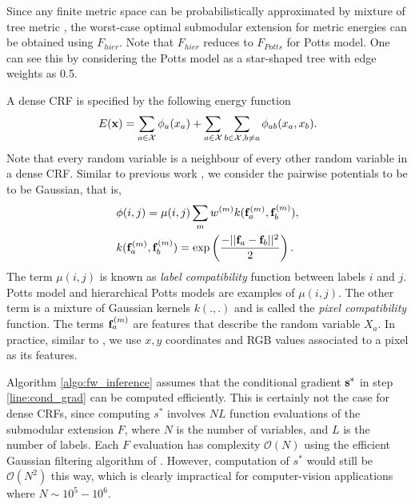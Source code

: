 Since any finite metric space can be probabilistically approximated by mixture
of tree metric \citep{bartal1996probabilistic}, the worst-case optimal
submodular extension for metric energies can be obtained using $F_{hier}$. Note
that $F_{hier}$ reduces to $F_{Potts}$ for Potts model. One can see this by
considering the Potts model as a star-shaped tree with edge weights as 0.5.

\label{sec:dense_crf}

 A dense CRF is specified by the following energy function 
\begin{equation}
    E({\bf x}) = \sum_{a \in {\mathcal X}} \phi_a(x_a) + \sum_{a \in {\mathcal X}} \sum_{b \in {\mathcal X}, b \neq a} \phi_{ab}(x_a, x_b).
\end{equation}
Note that every random variable is a neighbour of every other random variable in a dense CRF. Similar to previous work \citep{koltun2011efficient}, we consider the pairwise potentials to be to be Gaussian, that is, 
\begin{align}
    &\phi(i, j) = \mu(i, j) \sum_{m} w^{(m)} k({\bf f}_a^{(m)}, {\bf f}_b^{(m)}), \\
    &k({\bf f}_a^{(m)}, {\bf f}_b^{(m)}) = \exp\left( \frac{- ||{\bf f}_a - {\bf f}_b ||^2}{2} \right).
\end{align}
The term $\mu(i,j)$ is known as {\it label compatibility} function between
labels $i$ and $j$. Potts model and hierarchical Potts models are examples of
$\mu(i, j)$. The other term is a mixture of Gaussian kernels $k(.,.)$ and is
called the {\it pixel compatibility} function. The terms ${\bf f}_a^{(m)}$ are
features that describe the random variable $X_a$. In practice, similar to
\citep{koltun2011efficient}, we use $x, y$ coordinates and RGB values
associated to a pixel as its features.

Algorithm \ref{algo:fw_inference} assumes that the conditional gradient $\bf s^*$ in step {\ref{line:cond_grad}} can be computed efficiently. This is certainly not the case for dense CRFs, since computing $s^*$ involves $NL$ function evaluations of the submodular extension $F$, where $N$ is the number of variables, and $L$ is the number of labels. Each $F$ evaluation has complexity ${\mathcal O}(N)$ using the efficient Gaussian filtering algorithm of \citep{koltun2011efficient}. However, computation of $s^*$ would still be ${\mathcal O} (N^2)$ this way, which is clearly impractical for computer-vision applications where $N \sim 10^5 - 10^6$.

